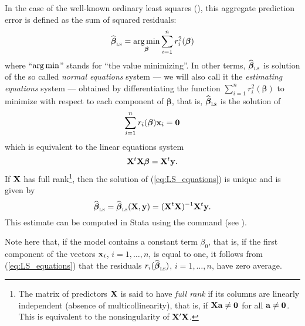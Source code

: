 In the case of the well-known ordinary least squares (), this
aggregate prediction error is defined as the sum of squared residuals:
%
\begin{equation}\label{eq:LS_min}
    \sthat{\boldsymbol\beta}_{\stsc{LS}} = \argmin_{\boldsymbol\beta} 
    \sum_{i=1}^{n} r_{i}^{2}(\boldsymbol\beta)
\end{equation}
%
where “$\mathop{\arg\min}$” stands for “the value minimizing”. In other terms,
$\sthat{\boldsymbol\beta}_{\stsc{LS}}$ is solution of the so called
\emph{normal equations} system --- we will also call it the \emph{estimating
equations} system --- obtained by differentiating the function $\sum_{i=1}^{n}
r_{i}^{2}(\boldsymbol\beta)$ to minimize with respect to each component of
$\boldsymbol\beta$, that is, $\sthat{\boldsymbol\beta}_{\stsc{LS}}$ is the
solution of
%
\begin{equation}\label{eq:LS_equations}
    \sum_{i=1}^{n}  r_{i}(\boldsymbol\beta)\mathbf x_{i} = \mathbf 0
\end{equation}
%
which is equivalent to the linear equations system
\[
    \mathbf X^t\mathbf X\boldsymbol\beta = \mathbf X^t\mathbf y.
\]
If $\mathbf X$ has full rank\footnote{The matrix of predictors $\mathbf X$ is
said to have \emph{full rank} if its columns are linearly independent (absence
of multicollinearity), that is, if $\mathbf X\mathbf a\neq\mathbf 0$ for all
$\mathbf a\neq\mathbf 0$. This is equivalent to the nonsingularity of
$\mathbf X'\mathbf X$.}, then the solution of (\ref{eq:LS_equations}) is unique
and is given by
%
\begin{equation}\label{eq:LS_estimator}
    \sthat{\boldsymbol\beta}_{\stsc{LS}}
    = \sthat{\boldsymbol\beta}_{\stsc{LS}}(\stmat{X}, \stvec{y})
    = (\stmat{X}^t\stmat{X})^{-1} \stmat{X}^t\stvec{y}.
\end{equation}
%
This estimate can be computed in Stata using the  command (see
).

Note here that, if the model contains a constant term $\beta_{0}$, that is, if
the first component of the vectors $\mathbf x_{i}$, $i = 1, \dots, n$, is equal
to one, it follows from (\ref{eq:LS_equations}) that the residuals
$r_{i}(\sthat{\boldsymbol\beta}_{\stsc{LS}})$, $i = 1, \dots, n$, have zero
average.

